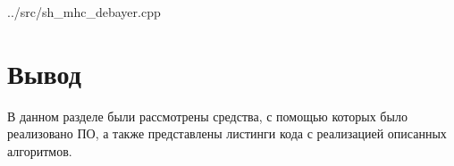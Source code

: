 \begin{lstinputlisting}[
	caption={Smooth hue transition + Malvar-He-Cutler.},
	label={lst:shmhc},
	style={customc},
	]{../src/sh_mhc_debayer.cpp}
\end{lstinputlisting}


\section*{Вывод}

В данном разделе были рассмотрены средства, с помощью которых было реализовано ПО, а также представлены листинги кода с реализацией описанных алгоритмов.

